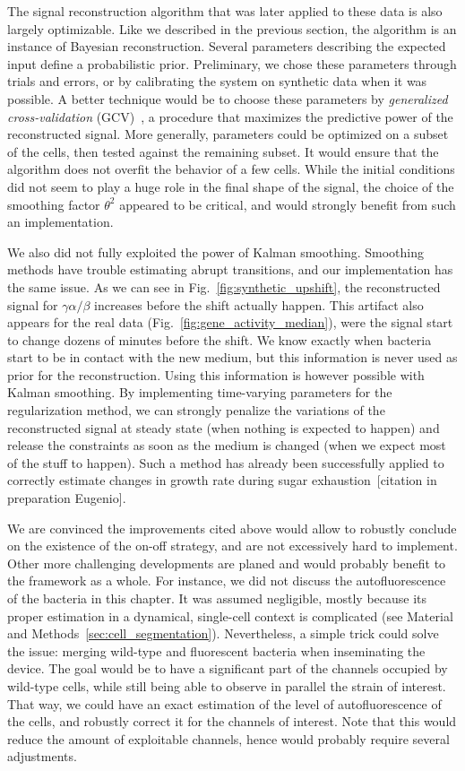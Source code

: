 The signal reconstruction algorithm that was later applied to these data is also largely optimizable.
Like we described in the previous section, the algorithm is an instance of Bayesian reconstruction.
Several parameters describing the expected input define a probabilistic prior.
Preliminary, we chose these parameters through trials and errors, or by calibrating the system on synthetic data when it was possible.
A better technique would be to choose these parameters by \textit{generalized cross-validation} (GCV)~\cite{golub_generalized_1979}, a procedure that maximizes the predictive power of the reconstructed signal.
More generally, parameters could be optimized on a subset of the cells, then tested against the remaining subset.
It would ensure that the algorithm does not overfit the behavior of a few cells.
While the initial conditions did not seem to play a huge role in the final shape of the signal, the choice of the smoothing factor $\theta^2$ appeared to be critical, and would strongly benefit from such an implementation.

We also did not fully exploited the power of Kalman smoothing.
Smoothing methods have trouble estimating abrupt transitions, and our implementation has the same issue.
As we can see in Fig.~\ref{fig:synthetic_upshift}, the reconstructed signal for $\gamma \alpha / \beta$ increases before the shift actually happen.
This artifact also appears for the real data (Fig.~\ref{fig:gene_activity_median}), were the signal start to change dozens of minutes before the shift.
We know exactly when bacteria start to be in contact with the new medium, but this information is never used as prior for the reconstruction.
Using this information is however possible with Kalman smoothing.
By implementing time-varying parameters for the regularization method, we can strongly penalize the variations of the reconstructed signal at steady state (when nothing is expected to happen) and release the constraints as soon as the medium is changed (when we expect most of the stuff to happen).
Such a method has already been successfully applied to correctly estimate changes in growth rate during sugar exhaustion~[citation in preparation Eugenio].

We are convinced the improvements cited above would allow to robustly conclude on the existence of the on-off strategy, and are not excessively hard to implement.
Other more challenging developments are planed and would probably benefit to the framework as a whole.
For instance, we did not discuss the autofluorescence of the bacteria in this chapter.
It was assumed negligible, mostly because its proper estimation in a dynamical, single-cell context is complicated (see Material and Methods~\ref{sec:cell_segmentation}).
Nevertheless, a simple trick could solve the issue: merging wild-type and fluorescent bacteria when inseminating the device.
The goal would be to have a significant part of the channels occupied by wild-type cells, while still being able to observe in parallel the strain of interest.
That way, we could have an exact estimation of the level of autofluorescence of the cells, and robustly correct it for the channels of interest.
Note that this would reduce the amount of exploitable channels, hence would probably require several adjustments. 

